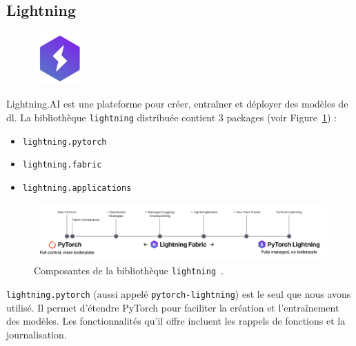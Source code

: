 \subsection{\foreignlanguage{english}{Lightning}}%
\label{subsec.lightning}

\begin{figure}
    \vspace*{-\topsep}
    \begin{flushright}
        \includegraphics[width=2cm]{assets/images/lightning.png}
    \end{flushright}
\end{figure}
\foreignlanguage{english}{Lightning.AI} est une plateforme pour créer, entraîner et déployer des modèles de \gls{dl}.
La bibliothèque \verb|lightning| distribuée contient 3 packages (voir Figure~\ref{fig.lightning-structure}) :
\begin{itemize}
    \item \verb|lightning.pytorch| 
    \item \verb|lightning.fabric|
    \item \verb|lightning.applications|
\end{itemize}

\begin{figure}[hbt]
    \begin{center}
        \includegraphics[width=\linewidth]{assets/images/lightning-strcture.png}
    \end{center}
    \cprotect\caption[Composantes de la bibliothèque \verb|lightning|.]%
    {Composantes de la bibliothèque \verb|lightning|~\cite{Falcon_PyTorch_Lightning_2019}.}
    \label{fig.lightning-structure}
\end{figure}

\verb|lightning.pytorch| (aussi appelé \verb|pytorch-lightning|) est le seul que nous avons utilisé.
Il permet d'étendre PyTorch pour faciliter la création et l'entraînement des modèles.
Les fonctionnalités qu'il offre incluent les rappels de fonctions et la journalisation.

